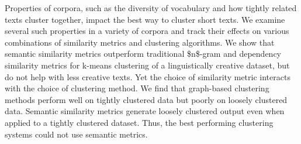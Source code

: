 Properties of corpora, such as the diversity of vocabulary and how tightly related texts cluster together, impact the best way to cluster short texts. We examine several such properties in a variety of corpora and track their effects on various combinations of similarity metrics and clustering algorithms. We show that semantic similarity metrics outperform traditional \$n\$-gram and dependency similarity metrics for k-means clustering of a linguistically creative dataset, but do not help with less creative texts. Yet the choice of similarity metric interacts with the choice of clustering method. We find that graph-based clustering methods perform well on tightly clustered data but poorly on loosely clustered data. Semantic similarity metrics generate loosely clustered output even when applied to a tightly clustered dataset. Thus, the best performing clustering systems could not use semantic metrics.

